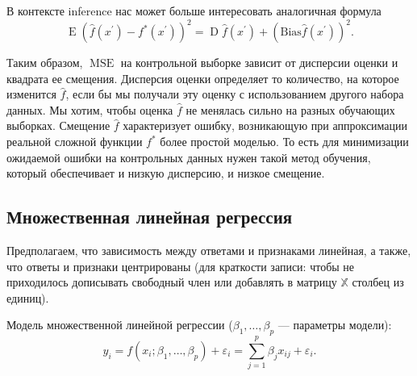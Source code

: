 \documentclass[11pt,colorlinks=true]{article}
\DeclareMathOperator{\MSE}{MSE}
\DeclareMathOperator{\E}{E}
\DeclareMathOperator{\D}{D}
\begin{document}

В контексте inference нас может больше интересовать аналогичная формула 
\begin{equation}\label{eq:MSE_test_f}
\E(\hat{f}(x^{\prime})-f^{\ast}(x^{\prime}))^{2}
=\D\hat{f}(x^{\prime})+(\mathrm{Bias}\hat{f}(x^{\prime}))^{2}.
\end{equation}

Таким образом, $\MSE$ на контрольной выборке зависит от дисперсии оценки и квадрата ее смещения.
Дисперсия оценки определяет то количество, на которое изменится $\hat{f}$, если бы мы получали эту оценку с использованием другого набора данных. Мы хотим, чтобы оценка $\hat{f}$ не менялась сильно на разных обучающих выборках. Смещение $\hat{f}$ характеризует ошибку, возникающую при аппроксимации реальной сложной функции $f^{\ast}$ более простой моделью. То есть для минимизации ожидаемой ошибки на контрольных данных нужен такой метод обучения, который обеспечивает и низкую дисперсию, и низкое смещение.

\subsection{Множественная линейная регрессия}
Предполагаем, что зависимость между ответами и признаками линейная, а также, что ответы и признаки центрированы (для краткости записи: чтобы не приходилось дописывать свободный член или добавлять в матрицу $\mathbb{X}$ столбец из единиц).

Модель множественной линейной регрессии ($\beta_{1},\ldots,\beta_{p}$ --- параметры модели):
\begin{equation*}
y_{i}
=
f(x_{i}; \beta_{1},\ldots,\beta_{p})+\varepsilon_{i}
=
\sum_{j=1}^{p}\beta_{j}x_{ij}+\varepsilon_{i}.
\end{equation*}
\end{document}
